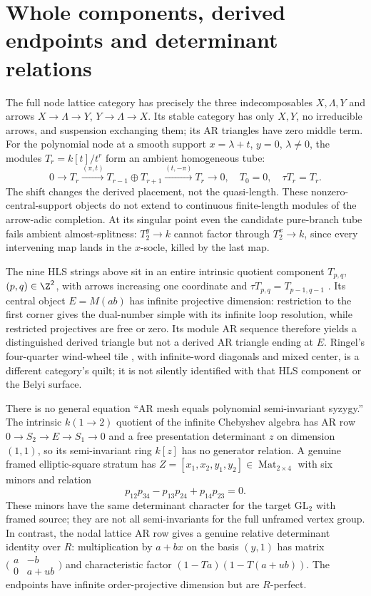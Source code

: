 \documentclass[11pt,oneside,openany]{book}
\theoremstyle{definition}\newtheorem{definition}[theorem]{Definition}
\theoremstyle{remark}\newtheorem{remark}[theorem]{Remark}
\begin{document}
\section{Whole components, derived endpoints and determinant relations}
The full node lattice category has precisely the three indecomposables $X,\Lambda,Y$ and arrows $X\to\Lambda\to Y$, $Y\to\Lambda\to X$. Its stable category has only $X,Y$, no irreducible arrows, and suspension exchanging them; its AR triangles have zero middle term. For the polynomial node at a smooth support $x=\lambda+t$, $y=0$, $\lambda\ne0$, the modules $T_r=k[t]/t^r$ form an ambient homogeneous tube:
\[
 0\longrightarrow T_r\xrightarrow{(\pi,t)}T_{r-1}\oplus T_{r+1}
 \xrightarrow{(t,-\pi)}T_r\longrightarrow0,\quad T_0=0,\quad\tau T_r=T_r.
\]
The shift changes the derived placement, not the quasi-length. These nonzero-central-support objects do not extend to continuous finite-length modules of the arrow-adic completion. At its singular point even the candidate pure-branch tube fails ambient almost-splitness: $T_2^y\to k$ cannot factor through $T_2^x\to k$, since every intervening map lands in the $x$-socle, killed by the last map.

The nine HLS strings above sit in an entire intrinsic quotient component $T_{p,q}$, $(p,q)\in\Z^2$, with arrows increasing one coordinate and $\tau T_{p,q}=T_{p-1,q-1}$ \cite{HuangLinSu}. Its central object $E=M(ab)$ has infinite projective dimension: restriction to the first corner gives the dual-number simple with its infinite loop resolution, while restricted projectives are free or zero. Its module AR sequence therefore yields a distinguished derived triangle but not a derived AR triangle ending at $E$. Ringel's four-quarter wind-wheel tile \cite{Ringel}, with infinite-word diagonals and mixed center, is a different category's quilt; it is not silently identified with that HLS component or the Belyi surface.

There is no general equation ``AR mesh equals polynomial semi-invariant syzygy.'' The intrinsic $k(1\to2)$ quotient of the infinite Chebyshev algebra has AR row $0\to S_2\to E\to S_1\to0$ and a free presentation determinant $z$ on dimension $(1,1)$, so its semi-invariant ring $k[z]$ has no generator relation. A genuine framed elliptic-square stratum has $Z=[x_1,x_2,y_1,y_2]\in\operatorname{Mat}_{2\times4}$ with six minors and relation
\[
 p_{12}p_{34}-p_{13}p_{24}+p_{14}p_{23}=0.
\]
These minors have the same determinant character for the target $\mathrm{GL}_2$ with framed source; they are not all semi-invariants for the full unframed vertex group. In contrast, the nodal lattice AR row gives a genuine relative determinant identity over $R$: multiplication by $a+bx$ on the basis $(y,1)$ has matrix
$\bigl(\begin{smallmatrix}a&-b\\0&a+ub\end{smallmatrix}\bigr)$ and characteristic factor $(1-Ta)(1-T(a+ub))$. The endpoints have infinite order-projective dimension but are $R$-perfect.
\end{document}
